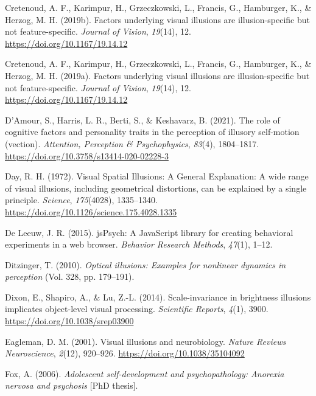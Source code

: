 \documentclass[
  man,floatsintext]{apa6}
\newlength{\cslhangindent}
\newlength{\cslentryspacingunit} %
\newenvironment{CSLReferences}[2] %
 {%
  \setlength{\parindent}{0pt}
  \ifodd #1
  \let\oldpar\par
  \def\par{\hangindent=\cslhangindent\oldpar}
  \fi
  \setlength{\parskip}{#2\cslentryspacingunit}
 }%
 {}
\begin{document}
\begin{CSLReferences}{1}{0}
\leavevmode{}%
Cretenoud, A. F., Karimpur, H., Grzeczkowski, L., Francis, G., Hamburger, K., \& Herzog, M. H. (2019b). Factors underlying visual illusions are illusion-specific but not feature-specific. \emph{Journal of Vision}, \emph{19}(14), 12. \url{https://doi.org/10.1167/19.14.12}

\leavevmode{}%
Cretenoud, A. F., Karimpur, H., Grzeczkowski, L., Francis, G., Hamburger, K., \& Herzog, M. H. (2019a). Factors underlying visual illusions are illusion-specific but not feature-specific. \emph{Journal of Vision}, \emph{19}(14), 12. \url{https://doi.org/10.1167/19.14.12}

\leavevmode{}%
D'Amour, S., Harris, L. R., Berti, S., \& Keshavarz, B. (2021). The role of cognitive factors and personality traits in the perception of illusory self-motion (vection). \emph{Attention, Perception \& Psychophysics}, \emph{83}(4), 1804--1817. \url{https://doi.org/10.3758/s13414-020-02228-3}

\leavevmode{}%
Day, R. H. (1972). Visual Spatial Illusions: A General Explanation: A wide range of visual illusions, including geometrical distortions, can be explained by a single principle. \emph{Science}, \emph{175}(4028), 1335--1340. \url{https://doi.org/10.1126/science.175.4028.1335}

\leavevmode{}%
De Leeuw, J. R. (2015). jsPsych: A JavaScript library for creating behavioral experiments in a web browser. \emph{Behavior Research Methods}, \emph{47}(1), 1--12.

\leavevmode{}%
Ditzinger, T. (2010). \emph{Optical illusions: Examples for nonlinear dynamics in perception} (Vol. 328, pp. 179--191).

\leavevmode{}%
Dixon, E., Shapiro, A., \& Lu, Z.-L. (2014). Scale-invariance in brightness illusions implicates object-level visual processing. \emph{Scientific Reports}, \emph{4}(1), 3900. \url{https://doi.org/10.1038/srep03900}

\leavevmode{}%
Eagleman, D. M. (2001). Visual illusions and neurobiology. \emph{Nature Reviews Neuroscience}, \emph{2}(12), 920--926. \url{https://doi.org/10.1038/35104092}

\leavevmode{}%
Fox, A. (2006). \emph{Adolescent self-development and psychopathology: Anorexia nervosa and psychosis} {[}PhD thesis{]}.


\end{CSLReferences}
\end{document}
